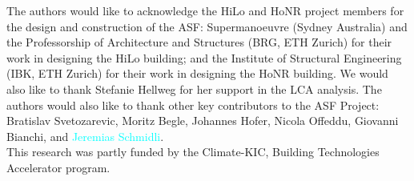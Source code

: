 
The authors would like to acknowledge the HiLo and HoNR project members for the design and construction of the ASF: Supermanoeuvre (Sydney Australia) and the Professorship of Architecture and Structures (BRG, ETH Zurich) for their work in designing the HiLo building; and the Institute of Structural Engineering (IBK, ETH Zurich) for their work in designing the HoNR building. We would also like to thank Stefanie Hellweg for her support in the LCA analysis. The authors would also like to thank other key contributors to the ASF Project: Bratislav Svetozarevic, Moritz Begle, Johannes Hofer, Nicola Offeddu, Giovanni Bianchi, and \textcolor{cyan}{Jeremias Schmidli}. \\

This research was partly funded by the Climate-KIC, Building Technologies Accelerator program.
